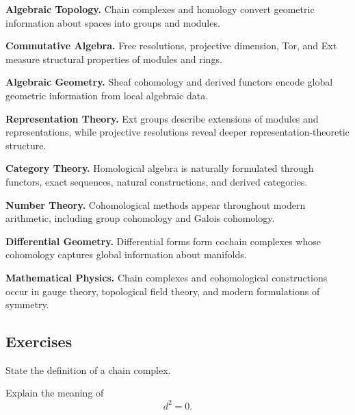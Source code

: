 \begin{applicationbox}
\textbf{Algebraic Topology.}
Chain complexes and homology convert geometric information about spaces into
groups and modules.

\medskip

\textbf{Commutative Algebra.}
Free resolutions, projective dimension, Tor, and Ext measure structural
properties of modules and rings.

\medskip

\textbf{Algebraic Geometry.}
Sheaf cohomology and derived functors encode global geometric information
from local algebraic data.

\medskip

\textbf{Representation Theory.}
Ext groups describe extensions of modules and representations, while
projective resolutions reveal deeper representation-theoretic structure.

\medskip

\textbf{Category Theory.}
Homological algebra is naturally formulated through functors, exact
sequences, natural constructions, and derived categories.

\medskip

\textbf{Number Theory.}
Cohomological methods appear throughout modern arithmetic, including group
cohomology and Galois cohomology.

\medskip

\textbf{Differential Geometry.}
Differential forms form cochain complexes whose cohomology captures global
information about manifolds.

\medskip

\textbf{Mathematical Physics.}
Chain complexes and cohomological constructions occur in gauge theory,
topological field theory, and modern formulations of symmetry.
\end{applicationbox}

\subsection{Exercises}
\label{subsec:homological-algebra-exercises}

\begin{exercise}[1]
State the definition of a chain complex.
\end{exercise}

\begin{exercise}[1]
Explain the meaning of
\[ d^2=0. \]
\end{exercise}

